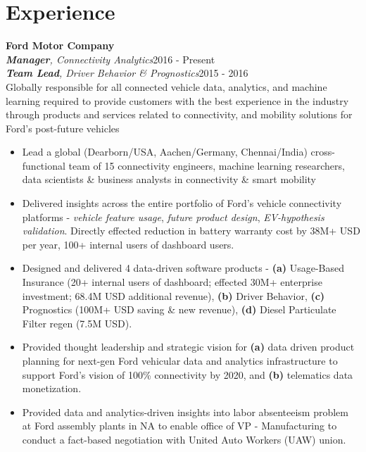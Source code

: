 \documentclass[letterpaper,11pt]{article}
\begin{document}
{\section{Experience}}
\textbf{Ford Motor Company}
      \\
       \emph{\textbf{Manager}, Connectivity Analytics}\hfill {2016 - Present}\\
       \emph{\textbf{Team Lead}, Driver Behavior \& Prognostics}\hfill {2015 - 2016}\\[1mm]
       Globally responsible for all connected vehicle data, analytics, and machine learning required to provide customers with the best experience in the industry through products and services related to connectivity, and mobility solutions for Ford's post-future vehicles \\[2mm]
\begin{itemize}[leftmargin=.2in]
 \setlength{\itemsep}{0pt}
 \setlength\itemsep{1mm}
 \item Lead a global (Dearborn/USA, Aachen/Germany, Chennai/India) cross-functional team of 15 connectivity engineers, machine learning researchers, data scientists \& business analysts in connectivity \& smart mobility 
\item Delivered insights across the entire portfolio of Ford's vehicle connectivity platforms - \emph{vehicle feature usage}, \emph{future product design}, \emph{EV-hypothesis validation}. Directly effected reduction in battery warranty cost by 38M+ USD per year, 100+ internal users of dashboard users.
\item Designed and delivered 4 data-driven software products - \textbf{(a)} Usage-Based Insurance (20+ internal users of dashboard; effected 30M+ enterprise investment; 68.4M USD additional revenue), \textbf{(b)} Driver Behavior, \textbf{(c)} Prognostics (100M+ USD saving \& new revenue), \textbf{(d)} Diesel Particulate Filter regen (7.5M USD).
\item Provided thought leadership and strategic vision for \textbf{(a)} data driven product planning for next-gen Ford vehicular data and analytics infrastructure to support Ford's vision of  100\% connectivity by 2020, and \textbf{(b)} telematics data monetization.
\item Provided data and analytics-driven insights into labor absenteeism problem at Ford assembly plants in NA to enable office of VP - Manufacturing to conduct a fact-based negotiation with United Auto Workers (UAW) union.
 \end{itemize}
\end{document}
